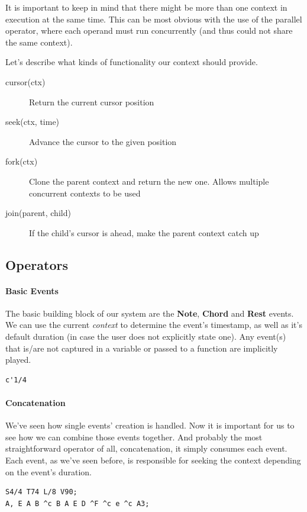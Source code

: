 \documentclass[a4paper,UKenglish,cleveref, autoref]{oasics-v2019}
\begin{document}
It is important to keep in mind that there might be more than one context in execution at the same time. This can be most obvious with the use of the parallel operator, where each operand must run concurrently (and thus could not share the same context).

Let's describe what kinds of functionality our context should provide.

\begin{description}
    \item[cursor(ctx)] Return the current cursor position
    \item[seek(ctx, time)] Advance the cursor to the given position
    \item[fork(ctx)] Clone the parent context and return the new one. Allows multiple concurrent contexts to be used
    \item[join(parent, child)] If the child's cursor is ahead, make the parent context catch up
\end{description}

\subsection{Operators}

\paragraph*{Basic Events}
The basic building block of our system are the \textbf{Note}, \textbf{Chord} and \textbf{Rest} events. We can use the current \textit{context} to determine the event's timestamp, as well as it's default duration (in case the user does not explicitly state one). Any event(s) that is/are not captured in a variable or passed to a function are implicitly played.

\begin{lstlisting}[caption={Creating a Note Event},label=list:3,captionpos=t,abovecaptionskip=-\medskipamount]
c'1/4
\end{lstlisting}

\paragraph*{Concatenation}
We've seen how single events' creation is handled. Now it is important for us to see how we can combine those events together. And probably the most straightforward operator of all, concatenation, it simply consumes each event. Each event, as we've seen before, is responsible for seeking the context depending on the event's duration.
\begin{lstlisting}[caption={Snippet of the song \textit{Wet Hands} by C418},label=list:4,captionpos=t,abovecaptionskip=-\medskipamount]
S4/4 T74 L/8 V90;
A, E A B ^c B A E D ^F ^c e ^c A3;
\end{lstlisting}
\end{document}
